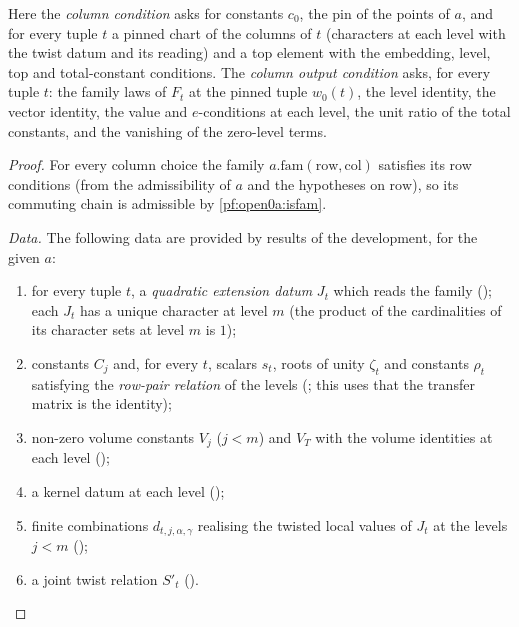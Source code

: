 Here the \emph{column condition} asks for constants $c_0$, the pin of the points of $a$, and for every tuple $t$ a
pinned chart of the columns of $t$ (characters at each level with the twist datum and its reading) and a top element
with the embedding, level, top and total-constant conditions. The \emph{column output condition} asks, for every tuple
$t$: the family laws of $F_t$ at the pinned tuple $w_0(t)$, the level identity, the vector identity, the value and
$e$-conditions at each level, the unit ratio of the total constants, and the vanishing of the zero-level terms.

\begin{proof}
For every column choice the family $a.\mathrm{fam}(\mathrm{row},\mathrm{col})$ satisfies its row conditions (from the
admissibility of $a$ and the hypotheses on $\mathrm{row}$), so its commuting chain is admissible by \cref{pf:open0a:isfam}.

\emph{Data.} The following data are provided by results of the development, for the given $a$:
\begin{enumerate}[label=(\alph*)]
\item for every tuple $t$, a \emph{quadratic extension datum} $J_t$ which reads the family
(); each $J_t$ has a unique character at level $m$
(the product of the cardinalities of its character sets at level $m$ is $1$);
\item constants $C_j$ and, for every $t$, scalars $s_t$, roots of unity $\zeta_t$ and constants $\rho_t$ satisfying the
\emph{row-pair relation} of the levels (; this uses
that the transfer matrix is the identity);
\item non-zero volume constants $V_j$ ($j<m$) and $V_T$ with the volume identities at each level
();
\item a kernel datum at each level ();
\item finite combinations $d_{t,j,\alpha,\gamma}$ realising the twisted local values of $J_t$ at the levels $j<m$
();
\item a joint twist relation $S'_t$ ().
\end{enumerate}


\end{proof}
